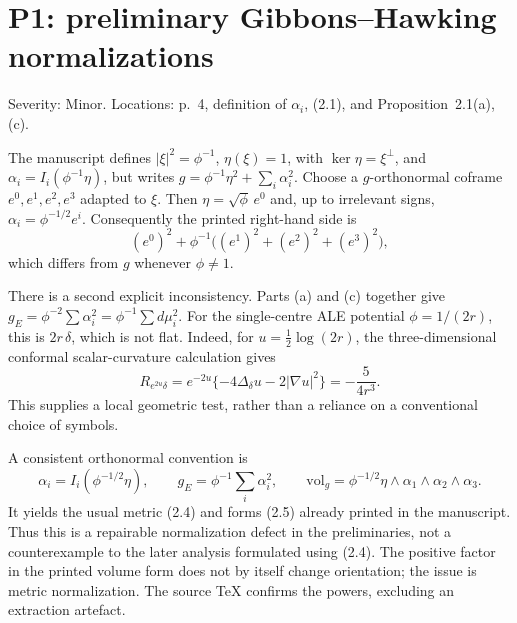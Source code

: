 \documentclass[10pt]{article}
\begin{document}
\section*{P1: preliminary Gibbons–Hawking normalizations}
Severity: Minor. Locations: p. 4, definition of \(\alpha_i\), (2.1), and Proposition 2.1(a),(c).\par
The manuscript defines \(|\xi|^2=\phi^{-1}\), \(\eta(\xi)=1\), with \(\ker\eta=\xi^\perp\), and \(\alpha_i=I_i(\phi^{-1}\eta)\), but writes \(g=\phi^{-1}\eta^2+\sum_i\alpha_i^2\). Choose a \(g\)-orthonormal coframe \(e^0,e^1,e^2,e^3\) adapted to \(\xi\). Then \(\eta=\sqrt{\phi}\,e^0\) and, up to irrelevant signs, \(\alpha_i=\phi^{-1/2}e^i\). Consequently the printed right-hand side is \[(e^0)^2+\phi^{-1}\bigl((e^1)^2+(e^2)^2+(e^3)^2\bigr),\] which differs from \(g\) whenever \(\phi\ne1\).\par
There is a second explicit inconsistency. Parts (a) and (c) together give \(g_E=\phi^{-2}\sum\alpha_i^2=\phi^{-1}\sum d\mu_i^2\). For the single-centre ALE potential \(\phi=1/(2r)\), this is \(2r\,\delta\), which is not flat. Indeed, for \(u=\frac12\log(2r)\), the three-dimensional conformal scalar-curvature calculation gives \[R_{e^{2u}\delta}
 =e^{-2u}\{-4\Delta_\delta u-2|\nabla u|^2\}
 =-\frac5{4r^3}.\] This supplies a local geometric test, rather than a reliance on a conventional choice of symbols.\par
A consistent orthonormal convention is \[\alpha_i=I_i(\phi^{-1/2}\eta),\qquad
 g_E=\phi^{-1}\sum_i\alpha_i^2,\qquad
 \mathrm{vol}_g=\phi^{-1/2}\eta\wedge\alpha_1\wedge\alpha_2\wedge\alpha_3.\] It yields the usual metric (2.4) and forms (2.5) already printed in the manuscript. Thus this is a repairable normalization defect in the preliminaries, not a counterexample to the later analysis formulated using (2.4). The positive factor in the printed volume form does not by itself change orientation; the issue is metric normalization. The source TeX confirms the powers, excluding an extraction artefact.\par
\end{document}
